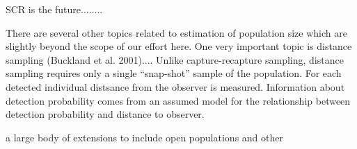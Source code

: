 \documentclass{book}
\begin{document}
SCR is the future........

There are several other topics related to estimation of population
size which are slightly beyond the scope of our effort here. One very
important topic is distance sampling (Buckland et al. 2001).... Unlike
capture-recapture sampling, distance sampling requires only a single
``snap-shot'' sample of the population. For each detected individual
distsance from the observer is measured.
Information about detection
probability comes from an assumed model for the relationship between
detection probability and distance to observer. 

a large body
of extensions to include open populations and other 
\end{document}
